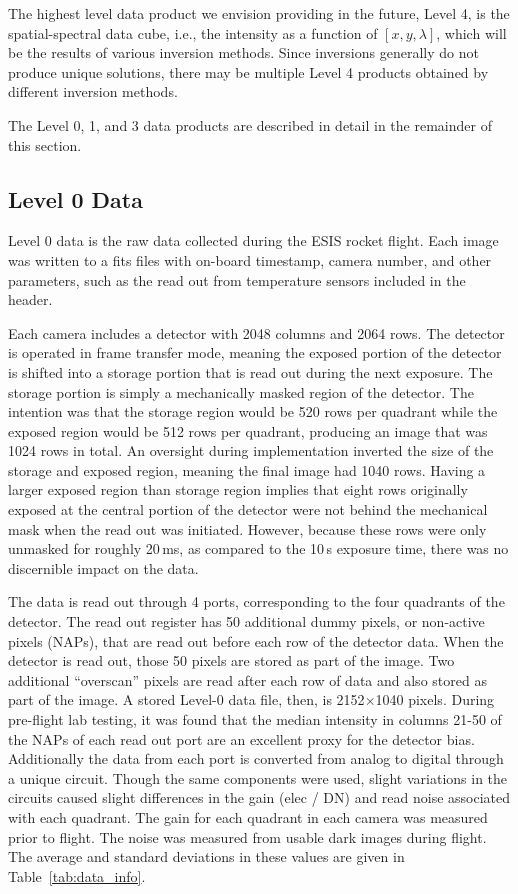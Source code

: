 The highest level data product we envision providing in the future, Level 4, is the spatial-spectral data cube, i.e., the intensity as a function of $[x, y , \lambda]$, which will be the results of various inversion methods.    
Since inversions generally do not produce unique solutions, there may be multiple Level 4 products obtained by different inversion methods.
   

The Level 0, 1, and 3 data products are described in detail in the remainder of this section. 


    
\subsection{Level 0 Data}
    
Level 0 data is the raw data collected during the ESIS rocket flight.  
Each image was written to a fits files with on-board timestamp, camera number, and other parameters, such as the read out from temperature sensors included in the header.   

Each camera includes a detector with 2048 columns and 2064 rows.  The detector is operated in frame transfer mode, meaning the exposed portion of the detector is shifted into a storage portion that is read out during the next exposure. The storage portion is simply a mechanically masked region of the detector. The intention was that the storage region would be 520 rows per quadrant while the exposed region would be 512 rows per quadrant, producing an image that was 1024 rows in total.  An oversight during implementation inverted the size of the storage and exposed region, meaning the final image had 1040 rows.  Having a larger exposed region than storage region implies that eight rows originally exposed at the central portion of the detector were not behind the mechanical mask when the read out was initiated. However, because these rows were only unmasked for roughly 20\,ms, as compared to the 10\,s exposure time, there was no discernible impact on the data. 



The data is read out through 4 ports, corresponding to the four quadrants of the detector.  The read out register has 50 additional dummy pixels, or non-active pixels (NAPs), that are read out before each row of the detector data.  When the detector is read out, those 50 pixels are stored as part of the image.  Two additional ``overscan'' pixels are read after each row of data and also stored as part of the image.  A stored Level-0 data file, then, is 2152$\times$1040 pixels.   During pre-flight lab testing, it was found that the median intensity in columns 21-50 of the NAPs of each read out port are an excellent proxy for the detector bias.  Additionally the data from each port is converted from analog to digital through a unique circuit.  Though the same components were used, slight variations in the circuits caused slight differences in the gain (elec / DN) and read  noise associated with each quadrant.  The gain for each quadrant in each camera was measured prior to flight.  The noise was measured from usable dark images during flight.  The average and standard deviations in these values are given in Table~\ref{tab:data_info}.
    
